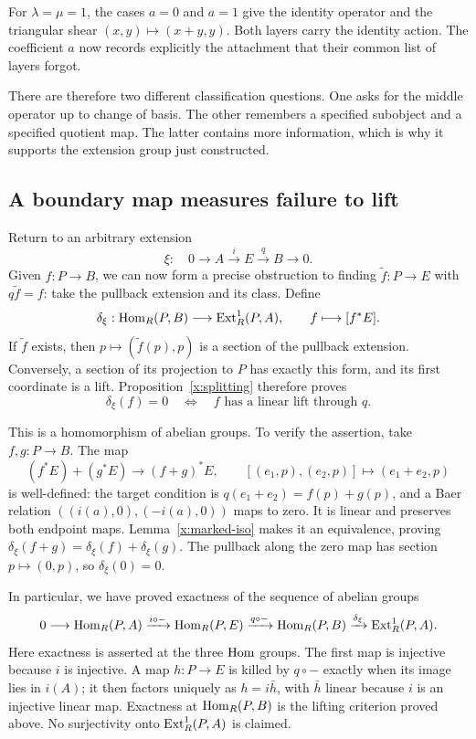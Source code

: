 For $\lambda=\mu=1$, the cases $a=0$ and $a=1$ give the identity
operator and the triangular shear $(x,y)\mapsto(x+y,y)$. Both layers carry the
identity action. The coefficient $a$ now records explicitly the
attachment that their common list of layers forgot.

There are therefore two different classification questions. One asks
for the middle operator up to change of basis. The other remembers a
specified subobject and a specified quotient map. The latter contains
more information, which is why it supports the extension group just
constructed.

\subsection{A boundary map measures failure to lift}\label{x:obstruction}

Return to an arbitrary extension
\[
\xi:\quad0\longrightarrow A\xrightarrow{i}E\xrightarrow{q}B
\longrightarrow0.
\]
Given $f:P\to B$, we can now form a precise obstruction to finding
$\widetilde f:P\to E$ with $q\widetilde f=f$: take the pullback
extension and its class. Define
\[
\delta_\xi:\operatorname{Hom}_R(P,B)\longrightarrow\operatorname{Ext}^1_R(P,A),
\qquad f\longmapsto[f^*E].
\]
If $\widetilde f$ exists, then $p\mapsto(\widetilde f(p),p)$ is a
section of the pullback extension. Conversely, a section of its
projection to $P$ has exactly this form, and its first coordinate is
a lift. Proposition~\ref{x:splitting} therefore proves
\[
\delta_\xi(f)=0
\quad\Longleftrightarrow\quad
f\text{ has a linear lift through }q.
\]

This is a homomorphism of abelian groups. To verify the assertion,
take $f,g:P\to B$. The map
\[
(f^*E)+(g^*E)\longrightarrow(f+g)^*E,
\qquad[(e_1,p),(e_2,p)]\longmapsto(e_1+e_2,p)
\]
is well-defined: the target condition is
$q(e_1+e_2)=f(p)+g(p)$, and a Baer relation
$((i(a),0),(-i(a),0))$ maps to zero. It is linear and preserves both
endpoint maps. Lemma~\ref{x:marked-iso} makes it an equivalence, proving
$\delta_\xi(f+g)=\delta_\xi(f)+\delta_\xi(g)$. The pullback along
the zero map has section $p\mapsto(0,p)$, so $\delta_\xi(0)=0$.

In particular, we have proved exactness of the sequence of abelian groups
\[
0\longrightarrow\operatorname{Hom}_R(P,A)\xrightarrow{i\circ-}\operatorname{Hom}_R(P,E)
\xrightarrow{q\circ-}\operatorname{Hom}_R(P,B)
\xrightarrow{\delta_\xi}\operatorname{Ext}^1_R(P,A).
\]
Here exactness is asserted at the three $\operatorname{Hom}$ groups. The first map
is injective because $i$ is injective. A map $h:P\to E$ is killed by
$q\circ-$ exactly when its image lies in $i(A)$; it then factors
uniquely as $h=i\bar h$, with $\bar h$ linear because $i$ is an
injective linear map. Exactness at $\operatorname{Hom}_R(P,B)$ is the lifting
criterion proved above. No surjectivity onto $\operatorname{Ext}^1_R(P,A)$ is claimed.

